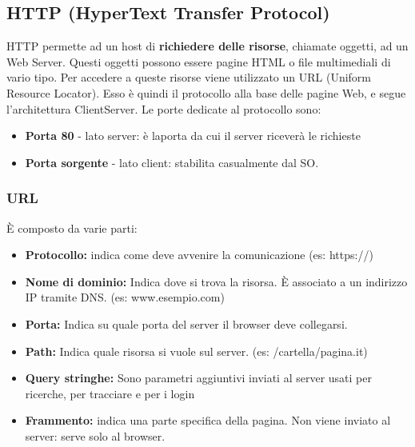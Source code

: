 \documentclass[12pt,a4paper,oneside]{book}
\begin{document}
\subsection{HTTP (HyperText Transfer Protocol)}
HTTP permette ad un host di \textbf{richiedere delle risorse}, chiamate
oggetti, ad un Web Server. Questi oggetti possono essere pagine
HTML o file multimediali di vario tipo. Per accedere a queste risorse
viene utilizzato un URL (Uniform Resource Locator). Esso è quindi il
protocollo alla base delle pagine Web, e segue l’architettura ClientServer. Le porte dedicate al protocollo sono:
\begin{itemize}
    \item \textbf{Porta 80} - lato server: è laporta da cui il server riceverà le richieste
    \item \textbf{Porta sorgente} - lato client: stabilita casualmente dal SO.
\end{itemize}
\subsubsection{URL} È composto da varie parti:
\begin{itemize}
    \item \textbf{Protocollo:} indica come deve avvenire la comunicazione (es: https://)
    \item \textbf{Nome di dominio:} Indica dove si trova la risorsa. È
associato a un indirizzo IP tramite DNS. (es: www.esempio.com)
    \item \textbf{Porta:} Indica su quale porta del server il browser deve collegarsi.
    \item \textbf{Path:} Indica quale risorsa si vuole sul server. (es: /cartella/pagina.it) 
    \item \textbf{Query stringhe:} Sono parametri aggiuntivi inviati al server usati per ricerche, per tracciare e per i login 
    \item \textbf{Frammento:} indica una parte specifica della pagina. Non viene inviato al server: serve solo al browser.
\end{itemize}
\end{document}
